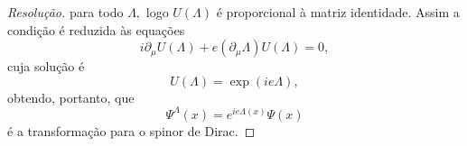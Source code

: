 \begin{proof}[Resolução]
    para todo \(\Lambda,\) logo \(U(\Lambda)\) é proporcional à matriz identidade. Assim a condição é reduzida às equações
    \begin{equation*}
        i \partial_\mu U(\Lambda) + e (\partial_\mu \Lambda) U(\Lambda) = 0,
    \end{equation*}
    cuja solução é
    \begin{equation*}
        U(\Lambda) = \exp(i e \Lambda),
    \end{equation*}
    obtendo, portanto, que
    \begin{equation*}
        \Psi^\Lambda(x) = e^{ie \Lambda(x)} \Psi(x)
    \end{equation*}
    é a transformação para o spinor de Dirac.
\end{proof}
